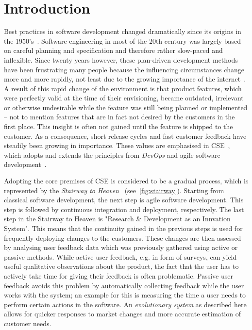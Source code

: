 %
\chapter{Introduction}
\label{sec:intro}

Best practices in software development changed dramatically since its origins in the 1950's~\cite{boehm2006view}.
Software engineering in most of the 20th century was largely based on careful planning and specification and therefore rather slow-paced and inflexible.
Since twenty years however, these plan-driven development methods have been frustrating many people because the influencing circumstances change more and more rapidly, not least due to the growing importance of the internet~\cite{Williams2003}.
A result of this rapid change of the environment is that product features, which were perfectly valid at the time of their envisioning, became outdated, irrelevant or otherwise undesirable while the feature was still being planned or implemented -- not to mention features that are in fact not desired by the customers in the first place.
This insight is often not gained until the feature is shipped to the customer.
As a consequence, short release cycles and fast customer feedback have steadily been growing in importance.
These values are emphasised in \acf{CSE}~\cite{Bosch2014}, which adopts and extends the principles from \emph{DevOps} and agile software development~\cite{Fitzgerald2017,fowler2001agile}.

Adopting the core premises of \ac{CSE} is considered to be a gradual process, which is represented by the \emph{Stairway to Heaven}~\cite{Olsson2012} (see~\cref{fig:stairway}).
Starting from classical software development, the next step is agile software development.
This step is followed by continuous integration and deployment, respectively. 
The last step in the Stairway to Heaven is "Research \& Development as an Innvation System".
This means that the continuity gained in the previous steps is used for frequently deploying changes to the customers.
These changes are then assessed by analysing user feedback data which was previously gathered using active or passive methods.
While active user feedback, e.g. in form of surveys, can yield useful qualitative observations about the product, the fact that the user has to actively take time for giving their feedback is often problematic.
Passive user feedback avoids this problem by automatically collecting feedback while the user works with the system; an example for this is measuring the time a user needs to perform certain actions in the software.
An \emph{evolutionary system} as described here allows for quicker responses to market changes and more accurate estimation of customer needs.

